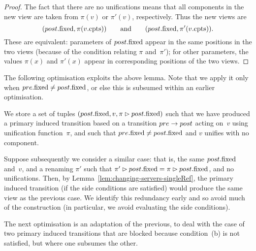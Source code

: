 
\begin{proof}
The fact that there are no unifications means that all components in the new
view are taken from $\pi(v)$ or $\pi'(v)$, respectively.  Thus the new views
are
\[
(post.\mathrm{fixed}, \pi(v.\mathrm{cpts})) \qquad\mbox{and}\qquad 
 (post.\mathrm{fixed}, \pi'(v.\mathrm{cpts})).
\]
These are equivalent: parameters of $post.\mathrm{fixed}$ appear in the same positions
in the two views (because of the condition relating $\pi$ and~$\pi'$); for
other parameters, the values $\pi(x)$ and $\pi'(x)$ appear in corresponding
positions of the two views.
\end{proof}


The following optimisation exploits the above lemma.  Note that we apply it
only when $pre.\mathrm{fixed} \ne post.\mathrm{fixed}$, or else this is subsumed within an
earlier optimisation.
%
\begin{opt}
\label{opt:changing-servers-singleRef}
We store a set of tuples $(post.\mathrm{fixed}, v, \pi \rhd post.\mathrm{fixed})$ such that
we have produced a primary induced transition based on a transition $pre
\stackrel{}\rightarrow post$ acting on~$v$ using unification function~$\pi$, and such that
$pre.\mathrm{fixed} \ne post.\mathrm{fixed}$ and $v$ unifies with no component. 

Suppose subsequently we consider a similar case: that is, the same
$post.\mathrm{fixed}$ and~$v$, and a renaming $\pi'$ such that $\pi' \rhd
post.\mathrm{fixed} = \pi \rhd post.\mathrm{fixed}$, and no unifications.  Then, by
Lemma~\ref{lem:changing-servers-singleRef}, the
primary induced transition (if the side conditions are satisfied) would
produce the same view as the previous case. 
%
We identify this redundancy early and so avoid much of the construction (in
particular, we avoid evaluating the side conditions).
\end{opt}


The next optimisation is an adaptation of the previous, to deal with the case
of two primary induced transitions that are blocked because condition~(b) is
not satisfied, but where one subsumes the other. 


